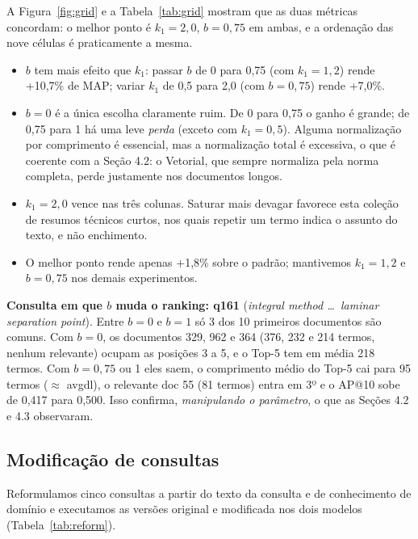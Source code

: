 \documentclass[10pt,a4paper]{article}
\begin{document}
A Figura~\ref{fig:grid} e a Tabela~\ref{tab:grid} mostram que as duas métricas
concordam: o melhor ponto é $k_1=2{,}0$, $b=0{,}75$ em ambas, e a ordenação das nove células é
praticamente a mesma.
\begin{itemize}
  \item $b$ tem mais efeito que $k_1$: passar $b$ de 0 para 0,75 (com $k_1=1{,}2$) rende
  +10,7\% de MAP; variar $k_1$ de 0,5 para 2,0 (com $b=0{,}75$) rende +7,0\%.
  \item $b=0$ é a única escolha claramente ruim. De 0 para 0,75 o ganho é grande; de 0,75
  para 1 há uma leve \emph{perda} (exceto com $k_1=0{,}5$). Alguma normalização por comprimento é
  essencial, mas a normalização total é excessiva, o que é coerente com a Seção 4.2: o Vetorial,
  que sempre normaliza pela norma completa, perde justamente nos documentos longos.
  \item $k_1=2{,}0$ vence nas três colunas. Saturar mais devagar favorece esta coleção de
  resumos técnicos curtos, nos quais repetir um termo indica o assunto do texto, e não
  enchimento.
  \item O melhor ponto rende apenas +1,8\% sobre o padrão; mantivemos $k_1=1{,}2$ e
  $b=0{,}75$ nos demais experimentos.
\end{itemize}

\textbf{Consulta em que $b$ muda o ranking: q161} (\emph{integral method \ldots\ laminar separation
point}). Entre $b=0$ e $b=1$ só 3 dos 10 primeiros documentos são comuns. Com $b=0$, os
documentos 329, 962 e 364 (376, 232 e 214 termos, nenhum relevante) ocupam as posições 3 a 5,
e o Top-5 tem em média 218 termos. Com $b=0{,}75$ ou 1 eles saem, o comprimento médio do Top-5 cai
para 95 termos ($\approx$ avgdl), o relevante doc 55 (81 termos) entra em 3º e o AP@10 sobe de
0,417 para 0,500. Isso confirma, \emph{manipulando o parâmetro}, o que as Seções 4.2 e 4.3
observaram.

\subsection{Modificação de consultas}
Reformulamos cinco consultas a partir do texto da consulta e de conhecimento de domínio e
executamos as versões original e modificada nos dois modelos (Tabela~\ref{tab:reform}).
\end{document}
